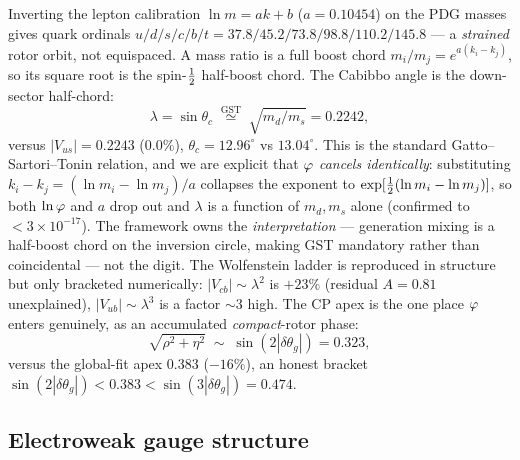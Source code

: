 Inverting the lepton calibration $\ln m=ak+b$ ($a=0.10454$) on the PDG masses
gives quark ordinals $u/d/s/c/b/t=37.8/45.2/73.8/98.8/110.2/145.8$ --- a
\emph{strained} rotor orbit, not equispaced. A mass ratio is a full boost chord
$m_i/m_j=e^{a(k_i-k_j)}$, so its square root is the spin-$\tfrac12$ half-boost
chord. The Cabibbo angle is the down-sector half-chord:
\begin{equation}
\lambda=\sin\theta_c \;\overset{\text{GST}}{\simeq}\; \sqrt{m_d/m_s}=0.2242,
\label{eq:particles:cabibbo}
\end{equation}
versus $|V_{us}|=0.2243$ ($0.0\%$), $\theta_c=12.96^\circ$ vs $13.04^\circ$. This
is the standard Gatto--Sartori--Tonin relation, and we are explicit that
\emph{$\varphi$ cancels identically}: substituting $k_i-k_j=(\ln m_i-\ln m_j)/a$
collapses the exponent to $\exp[\tfrac12(\ln m_i-\ln m_j)]$, so both $\ln\varphi$ and
$a$ drop out and $\lambda$ is a function of $m_d,m_s$ alone (confirmed to
$<3\times10^{-17}$). The framework owns the \emph{interpretation} --- generation
mixing is a half-boost chord on the inversion circle, making GST mandatory rather
than coincidental --- not the digit. The Wolfenstein ladder is reproduced in
structure but only bracketed numerically: $|V_{cb}|\sim\lambda^2$ is $+23\%$
(residual $A=0.81$ unexplained), $|V_{ub}|\sim\lambda^3$ is a factor $\sim 3$
high. The CP apex is the one place $\varphi$ enters genuinely, as an accumulated
\emph{compact}-rotor phase:
\begin{equation}
\sqrt{\rho^2+\eta^2}\;\sim\;\sin(2|\delta\theta_g|)=0.323,
\label{eq:particles:cp}
\end{equation}
versus the global-fit apex $0.383$ ($-16\%$), an honest bracket
$\sin(2|\delta\theta_g|)<0.383<\sin(3|\delta\theta_g|)=0.474$.

\subsection{Electroweak gauge structure}

